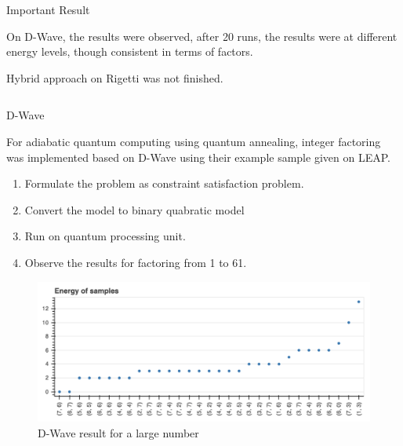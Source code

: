 \documentclass[final]{beamer}
\newlength{\onecolwid}
\newlength{\twocolwid}
\begin{document}
\begin{frame}[t]
\begin{columns}[t]
\begin{column}{\twocolwid}
\begin{columns}[t,totalwidth=\twocolwid]
\begin{column}{\onecolwid}
\end{column} %

\end{columns} %


\begin{alertblock}{Important Result}

On D-Wave, the results were observed, after 20 runs, the results were at different energy levels, though consistent in terms of factors. 

Hybrid approach on Rigetti was not finished.

\end{alertblock} 


\begin{columns}[t,totalwidth=\twocolwid] %

\begin{column}{\onecolwid} %



\begin{block}{D-Wave}

For adiabatic quantum computing using quantum annealing, integer factoring was implemented based on D-Wave using their example sample given on LEAP. 

\begin{enumerate}
\item Formulate the problem as constraint satisfaction problem.
\item Convert the model to binary quabratic model
\item Run on quantum processing unit.
\item Observe the results for factoring from 1 to 61.
\end{enumerate}
  
\begin{figure}
    \includegraphics[width=0.8\linewidth]{dwaveresult.png}
    \caption{D-Wave result for a large number}
    \end{figure}


\end{block}
\end{column}
\end{columns}
\end{column}
\end{columns}
\end{frame}
\end{document}
